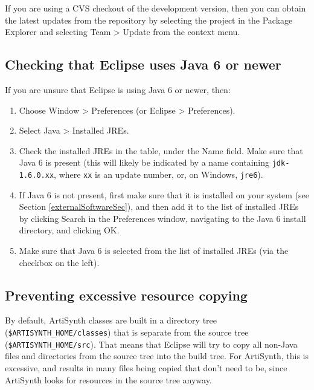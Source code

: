 \documentclass{article}
\begin{document}
If you are using a CVS checkout of the development version,
then you can obtain the latest updates from the repository
by selecting the project in the {\sf Package Explorer} and selecting
{\sf Team > Update} from the context menu.

\subsection{Checking that Eclipse uses Java 6 or newer }
\label{checkingEclipseJavaVersionSec} 

If you are unsure that Eclipse is using Java 6 or newer, then:

\begin{enumerate}

\item Choose {\sf Window > Preferences} (or {\sf Eclipse > Preferences}).

\item Select {\sf Java > Installed JREs}.

\item Check the installed JREs in the table, under the {\sf Name} field.  Make
sure that Java 6 is present (this will likely be indicated by a name
containing {\tt jdk-1.6.0.xx}, where {\tt xx} is an update number, or, on
Windows, {\tt jre6}).

\item If Java 6 is not present, first make sure that it is installed on
your system (see Section \ref{externalSoftwareSec}), and then add it to the list of
installed JREs by clicking {\sf Search} in the Preferences window,
navigating to the Java 6 install directory, and clicking {\sf OK}.

\item Make sure that Java 6 is selected from the list of installed JREs
(via the checkbox on the left).

\end{enumerate}

\subsection{Preventing excessive resource copying}

By default, ArtiSynth classes are built in a directory tree
({\tt \$ARTISYNTH\_HOME/classes}) that is separate from the source tree
({\tt \$ARTISYNTH\_HOME/src}). That means that Eclipse will try to copy all
non-Java files and directories from the source tree into the build
tree. For ArtiSynth, this is excessive, and results in many files
being copied that don't need to be, since ArtiSynth looks for
resources in the source tree anyway.
\end{document}
